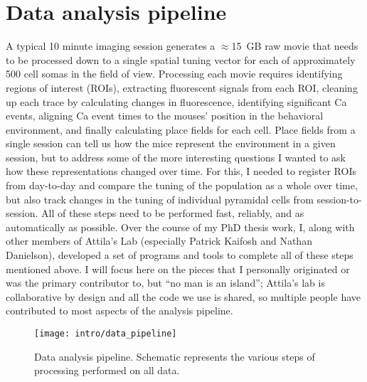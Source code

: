 \section{Data analysis pipeline}
\label{sec:intro:techniques:pipeline}
A typical 10 minute imaging session generates a $\approx$15~GB raw movie that needs to be processed down to a single spatial tuning vector for each of approximately 500 cell somas in the field of view.
Processing each movie requires identifying regions of interest (ROIs), extracting fluorescent signals from each ROI, cleaning up each trace by calculating changes in fluorescence, identifying significant Ca events, aligning Ca event times to the mouses' position in the behavioral environment, and finally calculating place fields for each cell.
Place fields from a single session can tell us how the mice represent the environment in a given session, but to address some of the more interesting questions I wanted to ask how these representations changed over time.
For this, I needed to register ROIs from day-to-day and compare the tuning of the population as a whole over time, but also track changes in the tuning of individual pyramidal cells from session-to-session.
All of these steps need to be performed fast, reliably, and as automatically as possible.
Over the course of my PhD thesis work, I, along with other members of Attila's Lab (especially Patrick Kaifosh and Nathan Danielson), developed a set of programs and tools to complete all of these steps mentioned above.
I will focus here on the pieces that I personally originated or was the primary contributor to, but ``no man is an island''; Attila's lab is collaborative by design and all the code we use is shared, so multiple people have contributed to most aspects of the analysis pipeline.

\begin{figure}
	\centering
	\texttt{[image: intro/data\_pipeline]}
	\caption[Data analysis pipeline]{Data analysis pipeline. Schematic represents the various steps of processing performed on all data.}
	\label{fig:intro:techniques:pipeline}
\end{figure}


